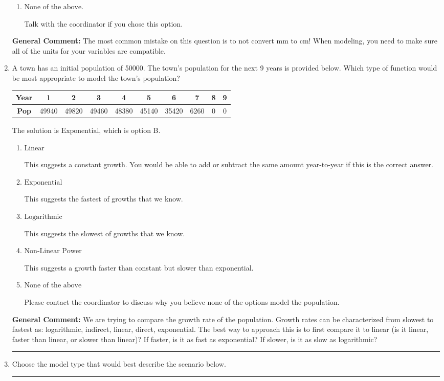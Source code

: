 \documentclass{extbook}[14pt]
\newcommand{\litem}[1]{\item #1

\rule{\textwidth}{0.4pt}}
\begin{document}
\begin{enumerate}
{\begin{enumerate}[label=\Alph*.]
This option uses the model $R = kl^{4}$ as if this is a direct variation.
\item \( \text{None of the above.} \)

Talk with the coordinator if you chose this option.
\end{enumerate}

\textbf{General Comment:} The most common mistake on this question is to not convert mm to cm! When modeling, you need to make sure all of the units for your variables are compatible.
}
\litem{
A town has an initial population of 50000. The town's population for the next 9 years is provided below. Which type of function would be most appropriate to model the town's population?


\begin{tabular}{c|c|c|c|c|c|c|c|c|c}
\textbf{Year} &1 &2 &3 &4 &5 &6 &7 &8 &9\tabularnewline \hline
\textbf{Pop} &49940 &49820 &49460 &48380 &45140 &35420 &6260 &0 &0\end{tabular}The solution is \( \text{Exponential} \), which is option B.\begin{enumerate}[label=\Alph*.]
\item \( \text{Linear} \)

This suggests a constant growth. You would be able to add or subtract the same amount year-to-year if this is the correct answer.
\item \( \text{Exponential} \)

This suggests the fastest of growths that we know.
\item \( \text{Logarithmic} \)

This suggests the slowest of growths that we know.
\item \( \text{Non-Linear Power} \)

This suggests a growth faster than constant but slower than exponential.
\item \( \text{None of the above} \)

Please contact the coordinator to discuss why you believe none of the options model the population.
\end{enumerate}

\textbf{General Comment:} We are trying to compare the growth rate of the population. Growth rates can be characterized from slowest to fastest as: logarithmic, indirect, linear, direct, exponential. The best way to approach this is to first compare it to linear (is it linear, faster than linear, or slower than linear)? If faster, is it as fast as exponential? If slower, is it as slow as logarithmic?
}
\litem{
Choose the model type that would best describe the scenario below.

}
\end{enumerate}
\end{document}
